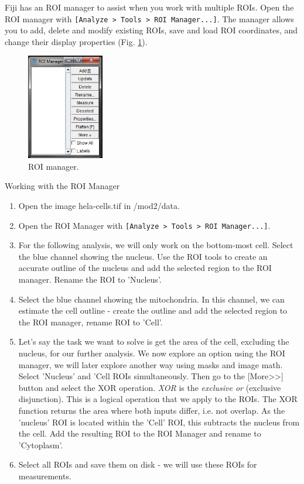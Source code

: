 Fiji has an ROI manager to assist when you work with multiple ROIs. Open the ROI manager with \texttt{[Analyze > Tools > ROI Manager...]}. The manager allows you to add, delete and modify existing ROIs, save and load ROI coordinates, and change their display properties (Fig. \ref{fig:roi-manager}).

\begin{figure}[!ht]
	\begin{center}
		\includegraphics[width=0.3\textwidth]{mod2/figures/roi-manager.png}
		\caption{ROI manager.}\label{fig:roi-manager}
	\end{center}
\end{figure}

\begin{taskbox}{Working with the ROI Manager}
\begin{enumerate}
	\item Open the image hela-cells.tif in /mod2/data.
	\item Open the ROI Manager with \texttt{[Analyze > Tools > ROI Manager...]}.
	\item For the following analysis, we will only work on the bottom-most cell. Select the blue channel showing the nucleus. Use the ROI tools to create an accurate outline of the nucleus and add the selected region to the ROI manager. Rename the ROI to 'Nucleus'.
	\item Select the blue channel showing the mitochondria. In this channel, we can estimate the cell outline - create the outline and add the selected region to the ROI manager, rename ROI to 'Cell'.
	\item Let's say the task we want to solve is get the area of the cell, excluding the nucleus, for our further analysis. We now explore an option using the ROI manager, we will later explore another way using masks and image math. Select 'Nucleus' and 'Cell ROIs simultaneously. Then go to the [More>>] button and select the XOR operation. 
\emph{XOR} is the \emph{exclusive or} (exclusive disjunction). This is a logical operation that we apply to the ROIs. The XOR function returns the area where both inputs differ, i.e. not overlap. As the 'nucleus' ROI is located within the 'Cell' ROI, this subtracts the nucleus from the cell. Add the resulting ROI to the ROI Manager and rename to 'Cytoplasm'.
	\item Select all ROIs and save them on disk - we will use these ROIs for measurements. 
\end{enumerate}

\end{taskbox}

